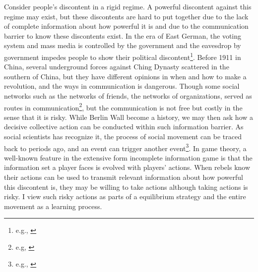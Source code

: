 \documentclass[12pt,letter]{article}
\theoremstyle{definition}
\theoremstyle{remark}
\theoremstyle{claim}
\begin{document}
Consider people's discontent in a rigid regime. A powerful discontent against this regime may exist, but these discontents are hard to put together due to the lack of complete information about how powerful it is and due to the communication barrier to know these discontents exist. In the era of East German, the voting system and mass media is controlled by the government and the eavesdrop by government impedes people to show their political discontent\footnote{e.g., \citep{Lohmann2011}}. Before 1911 in China, several underground forces against Ching Dynasty scattered in the southern of China, but they have different opinions in when and how to make a revolution, and the ways in communication is dangerous. Though some social networks such as the networks of friends, the networks of organizations, served as routes in communication\footnote{e.g, \citep{Karl-Dieter1993}}, but the communication is not free but costly in the sense that it is risky. While Berlin Wall become a history, we may then ask how a decisive collective action can be conducted within such information barrier. As social scientists has recognize it, the process of social movement can be traced back to periods ago, and an event can trigger another event\footnote{e.g., \citep{McAdamDoung;TarrowSidney;Tilly2001} \citep{McAdam2003} \citep{Lohmann2011}}. In game theory, a well-known feature in the extensive form incomplete information game is that the information set a player faces is evolved with players' actions. When rebels know their actions can be used to transmit relevant information about how powerful this discontent is, they may be willing to take actions although taking actions is risky. I view such risky actions as parts of a equilibrium strategy and the entire movement as a learning process. 
\end{document}
